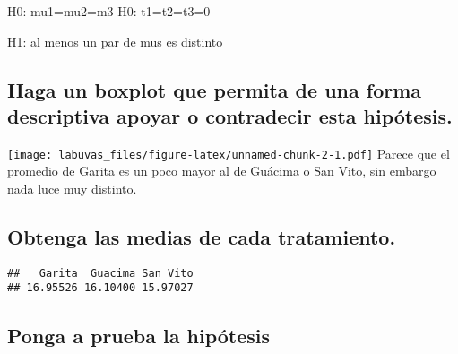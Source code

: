 \documentclass[
]{article}
\newenvironment{Shaded}{\begin{snugshade}}{\end{snugshade}}
\newcommand{\FunctionTok}[1]{\textcolor[rgb]{0.13,0.29,0.53}{\textbf{#1}}}
\newcommand{\NormalTok}[1]{#1}
\newcommand{\OtherTok}[1]{\textcolor[rgb]{0.56,0.35,0.01}{#1}}
\newcommand{\SpecialCharTok}[1]{\textcolor[rgb]{0.81,0.36,0.00}{\textbf{#1}}}
\begin{document}
H0: mu1=mu2=m3 H0: t1=t2=t3=0

H1: al menos un par de mus es distinto

\hypertarget{haga-un-boxplot-que-permita-de-una-forma-descriptiva-apoyar-o-contradecir-esta-hipuxf3tesis.}{%
\subsection{Haga un boxplot que permita de una forma descriptiva apoyar
o contradecir esta
hipótesis.}\label{haga-un-boxplot-que-permita-de-una-forma-descriptiva-apoyar-o-contradecir-esta-hipuxf3tesis.}}

\begin{Shaded}
\end{Shaded}

\texttt{[image: labuvas\_files/figure-latex/unnamed-chunk-2-1.pdf]}
Parece que el promedio de Garita es un poco mayor al de Guácima o San
Vito, sin embargo nada luce muy distinto.

\hypertarget{obtenga-las-medias-de-cada-tratamiento.}{%
\subsection{Obtenga las medias de cada
tratamiento.}\label{obtenga-las-medias-de-cada-tratamiento.}}

\begin{Shaded}
\end{Shaded}

\begin{verbatim}
##   Garita  Guacima San Vito 
## 16.95526 16.10400 15.97027
\end{verbatim}

\hypertarget{ponga-a-prueba-la-hipuxf3tesis}{%
\subsection{Ponga a prueba la
hipótesis}\label{ponga-a-prueba-la-hipuxf3tesis}}
\end{document}
